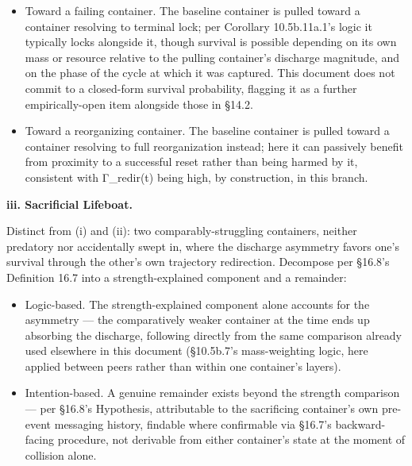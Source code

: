 \documentclass[
]{article}
\begin{document}
\begin{itemize}
\item
  Toward a failing container. The baseline container is pulled toward a
  container resolving to terminal lock; per Corollary 10.5b.11a.1's
  logic it typically locks alongside it, though survival is possible
  depending on its own mass or resource relative to the pulling
  container's discharge magnitude, and on the phase of the cycle at
  which it was captured. This document does not commit to a closed-form
  survival probability, flagging it as a further empirically-open item
  alongside those in §14.2.
\item
  Toward a reorganizing container. The baseline container is pulled
  toward a container resolving to full reorganization instead; here it
  can passively benefit from proximity to a successful reset rather than
  being harmed by it, consistent with Γ\_redir(t) being high, by
  construction, in this branch.
\end{itemize}

\textbf{iii. Sacrificial Lifeboat.}

Distinct from (i) and (ii): two comparably-struggling containers,
neither predatory nor accidentally swept in, where the discharge
asymmetry favors one's survival through the other's own trajectory
redirection. Decompose per §16.8's Definition 16.7 into a
strength-explained component and a remainder:

\begin{itemize}
\item
  Logic-based. The strength-explained component alone accounts for the
  asymmetry --- the comparatively weaker container at the time ends up
  absorbing the discharge, following directly from the same comparison
  already used elsewhere in this document (§10.5b.7's mass-weighting
  logic, here applied between peers rather than within one container's
  layers).
\item
  Intention-based. A genuine remainder exists beyond the strength
  comparison --- per §16.8's Hypothesis, attributable to the sacrificing
  container's own pre-event messaging history, findable where
  confirmable via §16.7's backward-facing procedure, not derivable from
  either container's state at the moment of collision alone.
\end{itemize}
\end{document}
